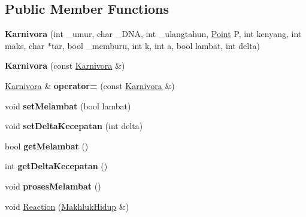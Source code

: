 \subsection*{Public Member Functions}
\begin{DoxyCompactItemize}
\item 
{\bfseries Karnivora} (int \+\_\+umur, char \+\_\+\+D\+NA, int \+\_\+ulangtahun, \hyperlink{class_point}{Point} P, int kenyang, int maks, char $\ast$tar, bool \+\_\+memburu, int k, int a, bool lambat, int delta)\hypertarget{class_karnivora_aa49aa02796b7915613503502a5ef64ee}{}\label{class_karnivora_aa49aa02796b7915613503502a5ef64ee}

\item 
{\bfseries Karnivora} (const \hyperlink{class_karnivora}{Karnivora} \&)\hypertarget{class_karnivora_a0ad77b06c2cbd1a19f477eb95449afed}{}\label{class_karnivora_a0ad77b06c2cbd1a19f477eb95449afed}

\item 
\hyperlink{class_karnivora}{Karnivora} \& {\bfseries operator=} (const \hyperlink{class_karnivora}{Karnivora} \&)\hypertarget{class_karnivora_a7a89e24705bddf06a2c55a3fdc9d3047}{}\label{class_karnivora_a7a89e24705bddf06a2c55a3fdc9d3047}

\item 
void {\bfseries set\+Melambat} (bool lambat)\hypertarget{class_karnivora_ad5085dc989bcb5ddb709d7351e01f7aa}{}\label{class_karnivora_ad5085dc989bcb5ddb709d7351e01f7aa}

\item 
void {\bfseries set\+Delta\+Kecepatan} (int delta)\hypertarget{class_karnivora_a7252b3126157047d2467828b63e27766}{}\label{class_karnivora_a7252b3126157047d2467828b63e27766}

\item 
bool {\bfseries get\+Melambat} ()\hypertarget{class_karnivora_afed2521496766e61af3f0977686a2fad}{}\label{class_karnivora_afed2521496766e61af3f0977686a2fad}

\item 
int {\bfseries get\+Delta\+Kecepatan} ()\hypertarget{class_karnivora_a3668b84ed03d4584b95ffdf0b88fd2cd}{}\label{class_karnivora_a3668b84ed03d4584b95ffdf0b88fd2cd}

\item 
void {\bfseries proses\+Melambat} ()\hypertarget{class_karnivora_a8e69eda1144d6789bb6d51aa48b5e569}{}\label{class_karnivora_a8e69eda1144d6789bb6d51aa48b5e569}

\item 
void \hyperlink{class_karnivora_a5835b08fcd4ca1d9d45459fedfceaf21}{Reaction} (\hyperlink{class_makhluk_hidup}{Makhluk\+Hidup} \&)
\end{DoxyCompactItemize}
